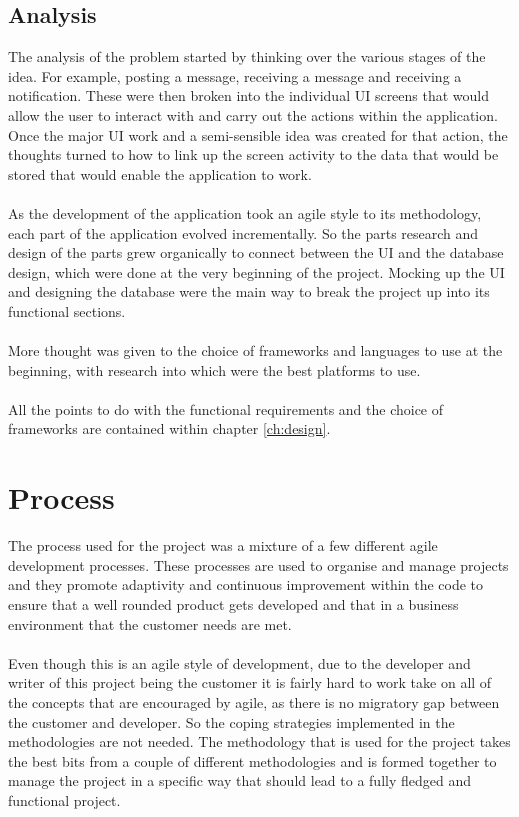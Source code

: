 \subsection{Analysis}

The analysis of the problem started by thinking over the various stages of the idea. For example, posting a message, receiving a message and receiving a notification. These were then broken into the individual UI screens that would allow the user to interact with and carry out the actions within the application. Once the major UI work and a semi-sensible idea was created for that action, the thoughts turned to how to link up the screen activity to the data that would be stored that would enable the application to work.\\
\\
As the development of the application took an agile style to its methodology, each part of the application evolved incrementally. So the parts research and design of the parts grew organically to connect between the UI and the database design, which were done at the very beginning of the project. Mocking up the UI and designing the database were the main way to break the project up into its functional sections.\\
\\
More thought was given to the choice of frameworks and languages to use at the beginning, with research into which were the best platforms to use.\\
\\
All the points to do with the functional requirements and the choice of frameworks are contained within chapter \ref{ch:design}.

\section{Process}
\label{sec:methodology}

The process used for the project was a mixture of a few different agile development processes. These processes are used to organise and manage projects and they promote adaptivity and continuous improvement within the code to ensure that a well rounded product gets developed and that in a business environment that the customer needs are met.\\
\\
Even though this is an agile style of development, due to the developer and writer of this project being the customer it is fairly hard to work take on all of the concepts that are encouraged by agile, as there is no migratory gap between the customer and developer. So the coping strategies implemented in the methodologies are not needed. The methodology that is used for the project takes the best bits from a couple of different methodologies and is formed together to manage the project in a specific way that should lead to a fully fledged and functional project.

